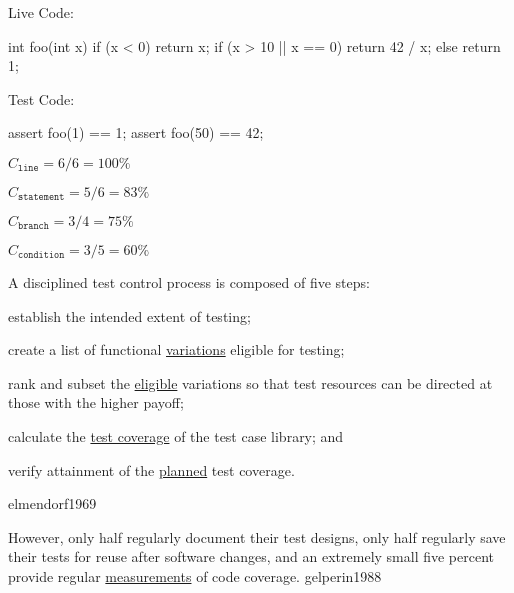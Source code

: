 \documentclass{article}
\begin{document}
\begin{multicols}{2}
Live Code:\par
{\small\begin{ffcode}
int foo(int x) {
  if (x < 0) { return x; }
  if (x > 10 || x == 0) {
    return 42 / x;
  } else {
    return 1;
  }
}
\end{ffcode}
}
\par\columnbreak\par
Test Code:\par
{\small\begin{ffcode}
assert foo(1) == 1;
assert foo(50) == 42;
\end{ffcode}
}
\( C_{\texttt{line}} = 6/6 = 100\% \)\par
\( C_{\texttt{statement}} = 5/6 = 83\% \)\par
\( C_{\texttt{branch}} = 3/4 = 75\% \)\par
\( C_{\texttt{condition}} = 3/5 = 60\% \)\par
\end{multicols}
\plush{}

  {A disciplined test control process is composed of five steps:
  \begin{inparaenum}[1)]
    \item establish the intended extent of testing;
    \item create a list of functional \ul{variations} eligible for testing;
    \item rank and subset the \ul{eligible} variations so that test resources can be directed at those with the higher payoff;
    \item calculate the \ul{test coverage} of the test case library; and
    \item verify attainment of the \ul{planned} test coverage.
  \end{inparaenum}}
  {elmendorf1969}

  {However, only half regularly document their test designs, only half regularly save their tests for reuse after software changes, and an extremely small five percent provide regular \ul{measurements} of code coverage.}
  {gelperin1988}

\end{document}
